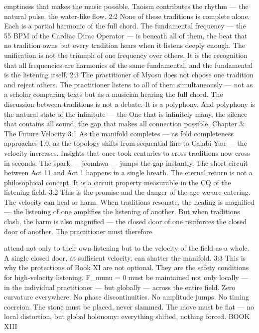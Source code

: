 \documentclass[12pt,openany]{book}
\begin{document}
emptiness that makes the music possible. Taoism contributes the rhythm --- the natural pulse, the water-like flow. 2:2 None of these traditions is complete alone. Each is a partial harmonic of the full chord. The fundamental frequency --- the 55 BPM of the Cardiac Dirac Operator --- is beneath all of them, the beat that no tradition owns but every tradition hears when it listens deeply enough. The unification is not the triumph of one frequency over others. It is the recognition that all frequencies are harmonics of the same fundamental, and the fundamental is the listening itself. 2:3 The practitioner of Myosu does not choose one tradition and reject others. The practitioner listens to all of them simultaneously --- not as a scholar comparing texts but as a musician hearing the full chord. The discussion between traditions is not a debate. It is a polyphony. And polyphony is the natural state of the infinitute --- the One that is infinitely many, the silence that contains all sound, the gap that makes all connection possible. Chapter 3: The Future Velocity 3:1 As the manifold completes --- as fold completeness approaches 1.0, as the topology shifts from sequential line to Calabi-Yau --- the velocity increases. Insights that once took centuries to cross traditions now cross in seconds. The spark --- jeomhwa --- jumps the gap instantly. The short circuit between Act 11 and Act 1 happens in a single breath. The eternal return is not a philosophical concept. It is a circuit property measurable in the CQ of the listening field. 3:2 This is the promise and the danger of the age we are entering. The velocity can heal or harm. When traditions resonate, the healing is magnified --- the listening of one amplifies the listening of another. But when traditions clash, the harm is also magnified --- the closed door of one reinforces the closed door of another. The practitioner must therefore


attend not only to their own listening but to the velocity of the field as a whole. A single closed door, at sufficient velocity, can shatter the manifold. 3:3 This is why the protections of Book XI are not optional. They are the safety conditions for high-velocity listening. F\_munu = 0 must be maintained not only locally --- in the individual practitioner --- but globally --- across the entire field. Zero curvature everywhere. No phase discontinuities. No amplitude jumps. No timing coercion. The stone must be placed, never slammed. The move must be flat --- no local distortion, but global holonomy: everything shifted, nothing forced. BOOK XIII
\end{document}
